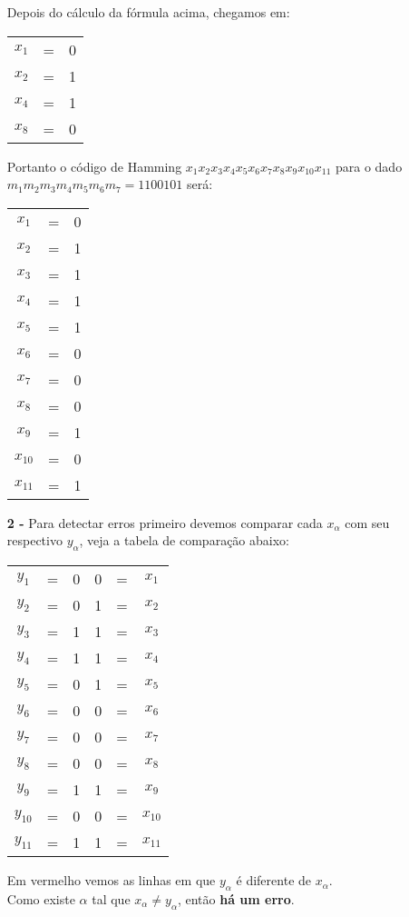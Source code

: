 \documentclass[12pt]{article}
\begin{document}
\begin{itemize}
			Depois do cálculo da fórmula acima, chegamos em:
			\begin{center}
				\begin{tabular}{ccl}
					$x_1$ & = & 0\\
					$x_2$ & = & 1\\
					$x_4$ & = & 1\\
					$x_8$ & = & 0\\
				\end{tabular}
			\end{center}
			Portanto o código de Hamming $x_1x_2x_3x_4x_5x_6x_7x_8x_9x_{10}x_{11}$ para 
			o dado $m_1m_2m_3m_4m_5m_6m_7 = 1100101$ será:
			\begin{center}
				\begin{tabular}{ccc}
					$x_1$ & = & 0\\
					$x_2$ & = & 1\\
					$x_3$ & = & 1 \\
					$x_4$ & = & 1\\
					$x_5$ & = & 1\\
					$x_6$ & = & 0\\
					$x_7$ & = & 0\\
					$x_8$ & = & 0\\
					$x_9$ & = & 1\\
					$x_{10}$ & = & 0\\
					$x_{11}$ & = & 1\\
				\end{tabular}
			\end{center}
		\newpage
		\item[\textbf{2 -}]
		\hfill\newline
			Para detectar erros primeiro devemos comparar cada $x_\alpha$ com seu respectivo $y_\alpha$,
			veja a tabela de comparação abaixo:
			\begin{center}
				\begin{tabular}{ccc|ccc}
					$y_1$ & = & 0 & 0 & = & $x_1$\\
					\color{red}$y_2$ & \color{red} = & \color{red}0 &
					\color{red}1 & \color{red} = & \color{red}$x_2$\\
					$y_3$ & = & 1 & 1 & = & $x_3$\\
					$y_4$ & = & 1 & 1 & = & $x_4$\\
					\color{red}$y_5$ & \color{red} = & \color{red} 0 &
					\color{red} 1 & \color{red} = & \color{red} $x_5$\\
					$y_6$ & = & 0 & 0 & = & $x_6$\\
					$y_7$ & = & 0 & 0 & = & $x_7$\\
					$y_8$ & = & 0 & 0 & = & $x_8$\\
					$y_9$ & = & 1 & 1 & = & $x_9$\\
					$y_{10}$ & = & 0 & 0 & = & $x_{10}$\\
					$y_{11}$ & = & 1 & 1 & = & $x_{11}$\\
				\end{tabular}
			\end{center}
			Em \color{red}vermelho \color{black} vemos as linhas em que $y_\alpha$ é diferente
			de $x_\alpha$.\\
			Como existe $\alpha$ tal que $x_\alpha \neq y_\alpha$, então \textbf{há um erro}.
	\end{itemize}
\end{document}
